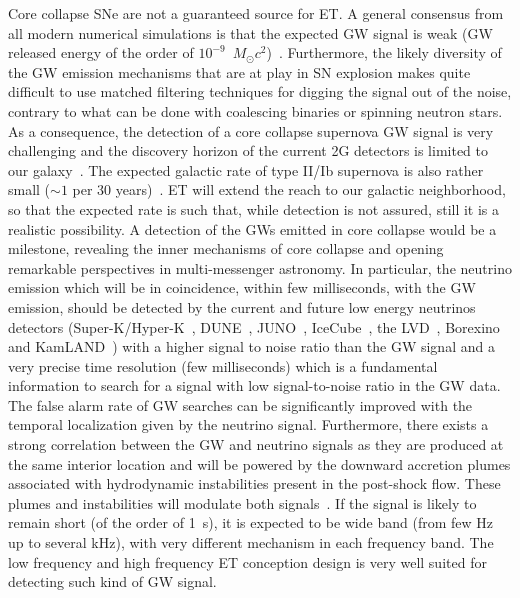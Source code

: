 Core collapse SNe are not a guaranteed source for ET. A general consensus from all modern numerical simulations is that the expected GW signal is weak (GW released energy of the order of $10^{-9}$~$M_\odot c^2$)~\cite{Radice:2018usf}. Furthermore, the likely diversity of the GW emission mechanisms that are at play in SN explosion makes quite difficult to use matched filtering techniques for digging the signal out of the noise, contrary to what can be done with coalescing binaries or spinning neutron stars. As a consequence,
the detection of a core collapse supernova GW signal is very challenging
and the discovery horizon of the current 2G detectors is limited to our galaxy~\cite{gossan:16}. The expected galactic rate of type II/Ib supernova is also rather small ($\sim 1$ per 30 years)~\cite{Diehl:2006cf}. ET will extend the reach to our galactic neighborhood, so that the expected rate is such that, while detection is not assured, still it is a realistic possibility.  
A detection of the GWs emitted in core collapse would be a milestone, revealing the inner mechanisms of core collapse and opening remarkable perspectives in multi-messenger astronomy. In particular,
the neutrino emission which will be in coincidence, within few milliseconds, with the GW emission, should be detected by the current and future low energy neutrinos detectors (Super-K/Hyper-K~\cite{Abe:2016waf}, DUNE~\cite{Ankowski:2016lab}, JUNO~\cite{Lu:2014zma}, IceCube~\cite{Abbasi:2011ss}, the LVD~\cite{Agafonova:2007hn}, Borexino~\cite{Cadonati:2000kq} and KamLAND~\cite{Tolich:2011zz}) with a higher signal to noise ratio than the GW signal and a very precise time resolution (few milliseconds) which is a fundamental information to search for a  signal with low signal-to-noise ratio  in the GW data. The false alarm rate of GW searches can be significantly improved with the temporal localization given by the neutrino signal. Furthermore, there exists a strong correlation between the GW and neutrino signals as they are produced at the same interior location and will be powered by the downward accretion plumes associated with hydrodynamic instabilities present in the post-shock flow. These plumes and instabilities will modulate both signals~\cite{Tamborra14,BMuller14,Kuroda:2017trn}.
If the signal is likely to remain short (of the order of 1~s), it is expected to be wide band (from few Hz up to several kHz), with very different mechanism in each frequency band. The low frequency and high frequency ET conception design is very well suited for detecting such kind of GW signal.

